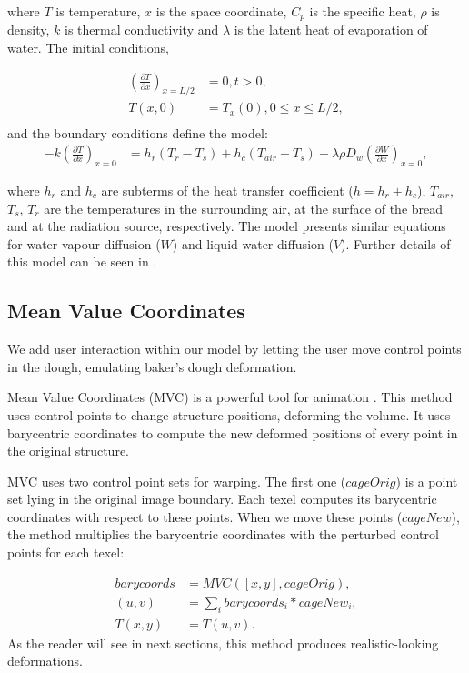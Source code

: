 \documentclass[final,5p,times]{elsarticle}
\begin{document}
\noindent where $T$ is temperature, $x$ is the space coordinate, $C_{p}$ is the specific heat, $\rho$ is density, $k$ is thermal conductivity and $\lambda$ is the latent heat of evaporation of water. The initial conditions,

\begin{align}
\left ( \frac{\partial T}{\partial x} \right )_{x=L/2} &= 0 , t > 0, \\
T(x,0) &= T_{x}(0), 0\le x \le L/2,\\
\end{align}
and the boundary conditions define the model:
\begin{align}
-k \left ( \frac{\partial T}{\partial x} \right )_{x=0} &= h_{r}(T_{r}-T_{s}) + h_{c}(T_{air}-T_{s}) - \lambda \rho D_{w} \left (\frac{\partial W}{\partial x} \right )_{x=0},
\end{align}

\noindent where $h_{r}$ and $h_{c}$ are subterms of the heat transfer coefficient ($h = h_{r}+h_{c}$), $T_{air}$, $T_{s}$, $T_{r}$ are the temperatures in the surrounding air, at the surface of the bread and at the radiation source, respectively. The model presents similar equations for water vapour diffusion ($W$) and  liquid water diffusion ($V$). Further details of this model can be seen in \cite{Powathil2004}.

\subsection{Mean Value Coordinates}
We add user interaction within our model by letting the user move control points in the dough, emulating baker's dough deformation.

Mean Value Coordinates (MVC) is a powerful tool for animation \cite{Floater2003,Floater2005,Ju2005}.  This method uses control points to change structure positions, deforming the volume. It uses barycentric coordinates to compute the new deformed positions of every point in the original structure.

MVC uses two control point sets for warping. The first one ($cageOrig$) is a point set lying in the original image boundary.  Each texel computes its barycentric coordinates with respect to these points. When we move these points ($cageNew$), the method multiplies the barycentric coordinates with the perturbed control points for each texel:

\begin{align}
barycoords &= MVC([x,y],cageOrig),\\
(u,v) &= \sum_{i} {barycoords_{i} * cageNew_{i}}, \\
T(x,y) &= T(u,v).
\end{align}
As the reader will see in next sections, this method produces realistic-looking deformations.
\end{document}
